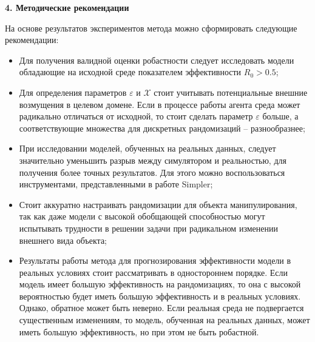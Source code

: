\newpage
\begin{center}
  \textbf{\large 4. Методические рекомендации}
\end{center}

  На основе результатов экспериментов метода можно сформировать следующие рекомендации:

  \begin{itemize}
      \item Для получения валидной оценки робастности следует исследовать модели обладающие на исходной среде показателем эффективности $R_0 > 0.5$;

      \item Для определения параметров $\varepsilon$ и $\mathcal{X}$ стоит учитывать потенциальные внешние возмущения в целевом домене. Если в процессе работы агента среда может радикально отличаться от исходной, то стоит сделать параметр $\varepsilon$ больше, а соответствующие множества для дискретных рандомизаций -- разнообразнее; 

      \item При исследовании моделей, обученных на реальных данных, следует значительно уменьшить разрыв между симулятором и реальностью, для получения более точных результатов. Для этого можно воспользоваться инструментами, представленными в работе Simpler;

      \item Стоит аккуратно настраивать рандомизации для объекта манипулирования, так как даже модели с высокой обобщающей способностью могут испытывать трудности в решении задачи при радикальном изменении внешнего вида объекта;
      
      \item Результаты работы метода для прогнозирования эффективности модели в реальных условиях стоит рассматривать в одностороннем порядке. Если модель имеет большую эффективность на рандомизациях, то она с высокой вероятностью будет иметь большую эффективность и в реальных условиях. Однако, обратное может быть неверно. Если реальная среда не подвергается существенным изменениям, то модель, обученная на реальных данных, может иметь большую эффективность, но при этом не быть робастной. 

      
  \end{itemize}


